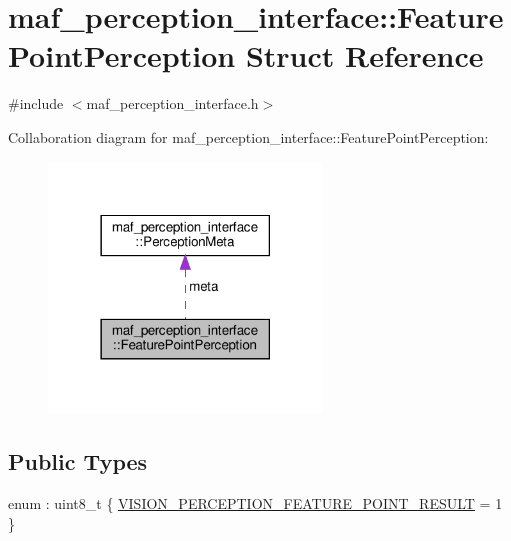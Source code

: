 \hypertarget{structmaf__perception__interface_1_1FeaturePointPerception}{}\section{maf\+\_\+perception\+\_\+interface\+:\+:Feature\+Point\+Perception Struct Reference}
\label{structmaf__perception__interface_1_1FeaturePointPerception}


{\ttfamily \#include $<$maf\+\_\+perception\+\_\+interface.\+h$>$}



Collaboration diagram for maf\+\_\+perception\+\_\+interface\+:\+:Feature\+Point\+Perception\+:\nopagebreak
\begin{figure}[H]
\begin{center}
\leavevmode
\includegraphics[width=206pt]{structmaf__perception__interface_1_1FeaturePointPerception__coll__graph}
\end{center}
\end{figure}
\subsection*{Public Types}
\begin{DoxyCompactItemize}
\item 
enum \+: uint8\+\_\+t \{ \hyperlink{structmaf__perception__interface_1_1FeaturePointPerception_a66956d7b55299dc298523541b2071d20a308bfa7d95d78223d67409777f282344}{V\+I\+S\+I\+O\+N\+\_\+\+P\+E\+R\+C\+E\+P\+T\+I\+O\+N\+\_\+\+F\+E\+A\+T\+U\+R\+E\+\_\+\+P\+O\+I\+N\+T\+\_\+\+R\+E\+S\+U\+LT} = 1
 \}
\end{DoxyCompactItemize}
